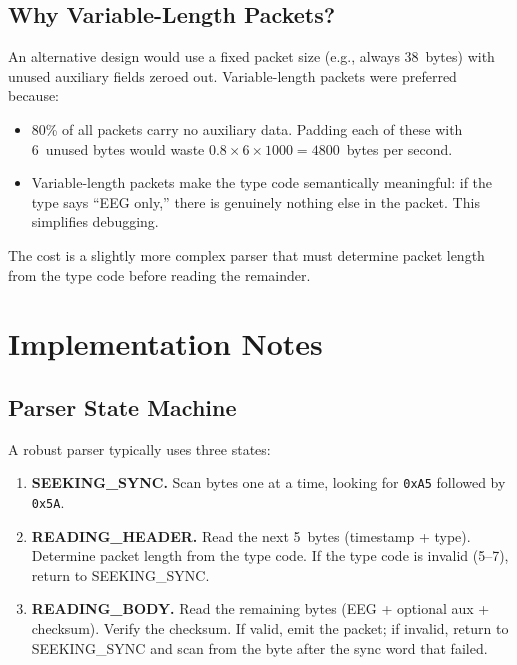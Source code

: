 \documentclass[11pt,a4paper]{article}
\newcommand{\hexval}[1]{\texttt{0x#1}}
\begin{document}
\subsection{Why Variable-Length Packets?}

An alternative design would use a fixed packet size (e.g., always 38~bytes) with unused auxiliary fields zeroed out.  Variable-length packets were preferred because:

\begin{itemize}
    \item 80\% of all packets carry no auxiliary data.  Padding each of these with 6~unused bytes would waste $0.8 \times 6 \times 1000 = 4800$~bytes per second.
    \item Variable-length packets make the type code semantically meaningful: if the type says ``EEG only,'' there is genuinely nothing else in the packet.  This simplifies debugging.
\end{itemize}

The cost is a slightly more complex parser that must determine packet length from the type code before reading the remainder.

\section{Implementation Notes}
\label{sec:impl}

\subsection{Parser State Machine}

A robust parser typically uses three states:

\begin{enumerate}
    \item \textbf{SEEKING\_SYNC.}  Scan bytes one at a time, looking for \hexval{A5} followed by \hexval{5A}.
    \item \textbf{READING\_HEADER.}  Read the next 5~bytes (timestamp + type).  Determine packet length from the type code.  If the type code is invalid (5--7), return to SEEKING\_SYNC.
    \item \textbf{READING\_BODY.}  Read the remaining bytes (EEG + optional aux + checksum).  Verify the checksum.  If valid, emit the packet; if invalid, return to SEEKING\_SYNC and scan from the byte after the sync word that failed.
\end{enumerate}
\end{document}
